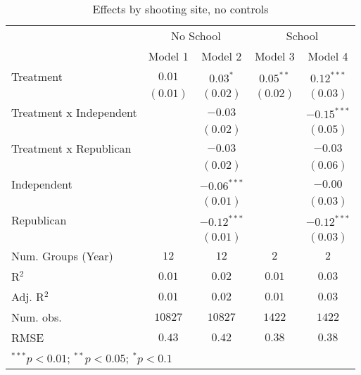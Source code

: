 
\begin{table}
\caption{Effects by shooting site, no controls}
\begin{center}
\begin{tabular}{l c c c c}
\toprule
 & \multicolumn{2}{c}{No School} & \multicolumn{2}{c}{School} \\
\cmidrule(lr){2-3} \cmidrule(lr){4-5}
 & Model 1 & Model 2 & Model 3 & Model 4 \\
\midrule
Treatment               & $0.01$   & $0.03^{*}$    & $0.05^{**}$ & $0.12^{***}$  \\
                        & $(0.01)$ & $(0.02)$      & $(0.02)$    & $(0.03)$      \\
Treatment x Independent &          & $-0.03$       &             & $-0.15^{***}$ \\
                        &          & $(0.02)$      &             & $(0.05)$      \\
Treatment x Republican  &          & $-0.03$       &             & $-0.03$       \\
                        &          & $(0.02)$      &             & $(0.06)$      \\
Independent             &          & $-0.06^{***}$ &             & $-0.00$       \\
                        &          & $(0.01)$      &             & $(0.03)$      \\
Republican              &          & $-0.12^{***}$ &             & $-0.12^{***}$ \\
                        &          & $(0.01)$      &             & $(0.03)$      \\
\midrule
Num. Groups (Year)      & $12$     & $12$          & $2$         & $2$           \\
R$^2$                   & $0.01$   & $0.02$        & $0.01$      & $0.03$        \\
Adj. R$^2$              & $0.01$   & $0.02$        & $0.01$      & $0.03$        \\
Num. obs.               & $10827$  & $10827$       & $1422$      & $1422$        \\
RMSE                    & $0.43$   & $0.42$        & $0.38$      & $0.38$        \\
\bottomrule
\multicolumn{5}{l}{\scriptsize{$^{***}p<0.01$; $^{**}p<0.05$; $^{*}p<0.1$}}
\end{tabular}
\label{table_school_no_controls}
\end{center}
\end{table}
